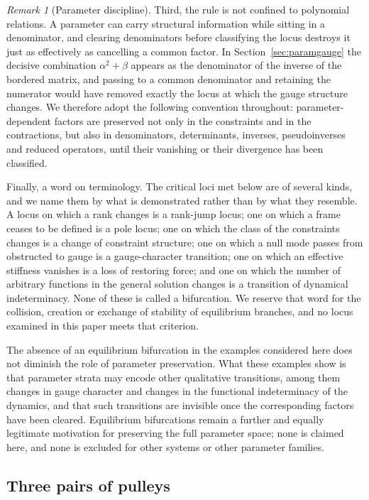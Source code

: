 \documentclass[12pt]{article}
\theoremstyle{plain}
\theoremstyle{definition}
\theoremstyle{remark}
\newtheorem{remark}[theorem]{Remark}
\begin{document}
\begin{remark}[Parameter discipline]
		Third, the rule is not confined to polynomial relations. A parameter can
		carry structural information while sitting in a denominator, and clearing
		denominators before classifying the locus destroys it just as effectively as
		cancelling a common factor. In Section~\ref{sec:paramgauge} the decisive
		combination $\alpha^{2}+\beta$ appears as the denominator of the inverse of
		the bordered matrix, and passing to a common denominator and retaining the
		numerator would have removed exactly the locus at which the gauge structure
		changes. We therefore adopt the following convention throughout:
		parameter-dependent factors are preserved not only in the constraints and in
		the contractions, but also in denominators, determinants, inverses,
		pseudoinverses and reduced operators, until their vanishing or their
		divergence has been classified.
		
		Finally, a word on terminology. The critical loci met below are of several
		kinds, and we name them by what is demonstrated rather than by what they
		resemble. A locus on which a rank changes is a rank-jump locus; one on which
		a frame ceases to be defined is a pole locus; one on which the class of the
		constraints changes is a change of constraint structure; one on which a null
		mode passes from obstructed to gauge is a gauge-character transition; one on
		which an effective stiffness vanishes is a loss of restoring force; and one
		on which the number of arbitrary functions in the general solution changes
		is a transition of dynamical indeterminacy. None of these is called a
		bifurcation. We reserve that word for the collision, creation or exchange of
		stability of equilibrium branches, and no locus examined in this paper meets
		that criterion.
		
		The absence of an equilibrium bifurcation in the examples considered here
		does not diminish the role of parameter preservation. What these examples
		show is that parameter strata may encode other qualitative transitions,
		among them changes in gauge character and changes in the functional
		indeterminacy of the dynamics, and that such transitions are invisible once
		the corresponding factors have been cleared. Equilibrium bifurcations remain
		a further and equally legitimate motivation for preserving the full
		parameter space; none is claimed here, and none is excluded for other
		systems or other parameter families.
	\end{remark}
	
	\subsection{Three pairs of pulleys}
	\label{sec:pulley3}
	
\end{document}
